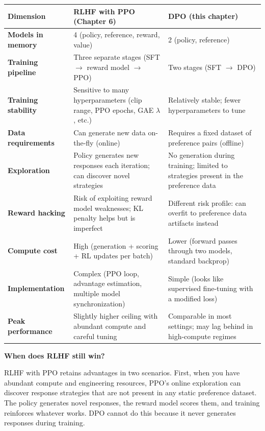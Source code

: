 \begin{chapterenv}
\begin{center}
\small
\begin{tabular}{p{}p{}p{}}
\toprule
\textbf{Dimension} & \textbf{RLHF with PPO (Chapter 6)} & \textbf{DPO (this chapter)} \\
\midrule
\textbf{Models in memory} & 4 (policy, reference, reward, value) & 2 (policy, reference) \\
\textbf{Training pipeline} & Three separate stages (SFT $\to$ reward model $\to$ PPO) & Two stages (SFT $\to$ DPO) \\
\textbf{Training stability} & Sensitive to many hyperparameters (clip range, PPO epochs, GAE $\lambda$, etc.) & Relatively stable; fewer hyperparameters to tune \\
\textbf{Data requirements} & Can generate new data on-the-fly (online) & Requires a fixed dataset of preference pairs (offline) \\
\textbf{Exploration} & Policy generates new responses each iteration; can discover novel strategies & No generation during training; limited to strategies present in the preference data \\
\textbf{Reward hacking} & Risk of exploiting reward model weaknesses; KL penalty helps but is imperfect & Different risk profile: can overfit to preference data artifacts instead \\
\textbf{Compute cost} & High (generation + scoring + RL updates per batch) & Lower (forward passes through two models, standard backprop) \\
\textbf{Implementation} & Complex (PPO loop, advantage estimation, multiple model synchronization) & Simple (looks like supervised fine-tuning with a modified loss) \\
\textbf{Peak performance} & Slightly higher ceiling with abundant compute and careful tuning & Comparable in most settings; may lag behind in high-compute regimes \\
\bottomrule
\end{tabular}
\end{center}

\textbf{When does RLHF still win?}

RLHF with PPO retains advantages in two scenarios. First, when you have abundant compute and engineering resources, PPO's online exploration can discover response strategies that are not present in any static preference dataset. The policy generates novel responses, the reward model scores them, and training reinforces whatever works. DPO cannot do this because it never generates responses during training.


\end{chapterenv}

